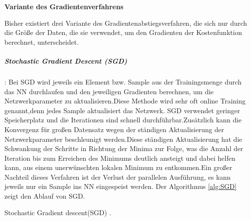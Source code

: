 \documentclass[12pt,a4paper]{scrartcl}
\numberwithin{equation}{section}
\begin{document}
\begin{center}
	\textbf{Variante des Gradientenverfahrens}
\end{center}
Bisher existiert drei Variante des Gradientenabstiegsverfahren, die sich nur durch die Größe der Daten, die sie verwendet, um den Gradienten der Kostenfunktion berechnet, unterscheidet.
\subparagraph{Stochastic Gradient Descent (SGD)}:
Bei SGD wird jeweils ein Element bzw. Sample aus der Trainingsmenge durch das \ac{NN} durchlaufen und den jeweiligen Gradienten berechnen, um die Netzwerkparameter zu aktualisieren.Diese Methode wird sehr oft online Training  genannt,denn jedes Sample aktualisiert das Netzwerk. SGD verwendet geringer Speicherplatz und die Iterationen sind schnell durchführbar.Zusätzlich kann die Konvergenz für großen Datensatz wegen der ständigen Aktualisierung der Netzwerkparameter beschleunigt werden.Diese ständigen Aktualisierung hat die Schwankung der Schritte in Richtung der Minima zur Folge, was die Anzahl der Iteration bis zum Erreichen des Minimums deutlich ansteigt und dabei helfen kann, aus einem unerwünschten lokalen Minimum zu entkommen.Ein großer Nachteil dieses Verfahren ist der Verlust der parallelen Ausführung, es kann jeweils nur ein Sample ins \ac{NN} eingespeist werden. Der Algorithmus \ref{alg:SGD} zeigt den Ablauf von SGD.
\begin{algorithm}

	\DontPrintSemicolon
	
	\caption{Stochastic Gradient descent(SGD) \cite{CNNStory}.}
	\label{alg:SGD}
\end{algorithm}
\end{document}
